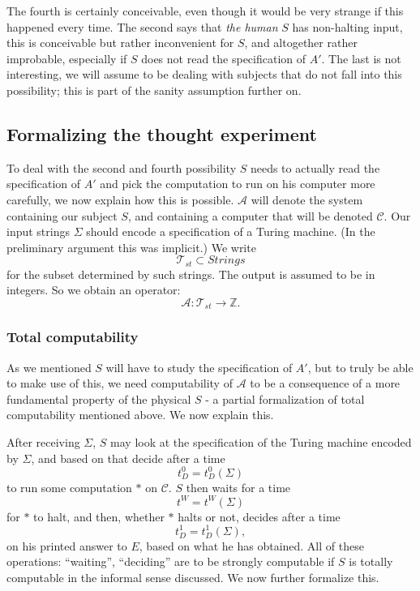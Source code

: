 \documentclass[9pt,twocolumn,twoside,lineno]{pnas-new}
\numberwithin{equation}{section}
\theoremstyle{definition}
\theoremstyle{remark}
\begin{document}
The fourth is certainly conceivable, even though it would be very strange if this happened every time. The second says that \emph{the human} $S$ has non-halting input, this is conceivable but rather inconvenient for $S$, and altogether rather improbable, especially if $S$ does not read the specification of $A'$.
The last is not interesting, we will assume to be dealing with subjects that do not fall into this possibility; this is part of the sanity assumption further on.
\subsection {Formalizing the thought experiment}
To deal with the second and fourth possibility $S$ needs to actually read the specification of $A'$ and pick the computation to run on his computer more carefully, we now explain how this is possible.
$\mathcal{A}$ will denote the system containing our subject $S$, and containing a computer that will be denoted $\mathcal{C}$.  Our input strings $\Sigma$ should encode a specification of a Turing machine. (In the preliminary argument this was implicit.) We write $$\mathcal{T} _{st} \subset Strings$$  for the subset determined by such strings.  The output is assumed to be in integers.
So we obtain an operator:
\begin{equation*}
\mathcal{A}: \mathcal{T} _{st}  \to \mathbb{Z}.
\end{equation*}
\subsubsection {Total computability} 
 As we mentioned $S$ will have to study the specification of $A' $, but to 
 truly be able to make use of this, we 
  need computability of $\mathcal{A}$ to be a consequence of a more fundamental property of the physical $S$ - a partial formalization of total computability mentioned above.  We now explain this. 


After receiving $\Sigma$, $S$ may look at the specification of the Turing machine encoded by $\Sigma$, and based on that decide after a time $$t _{D}   ^{0} = t _{D} ^{0} (\Sigma)    $$ to run some computation $*$
on $\mathcal{C}$. $S$ then waits for a time $$t ^{W} = t ^{W} (\Sigma)  $$ for $*$ to halt, and then, whether $*$ halts or not, decides after a time $$t  ^{1} _{D} = t _{D} ^{1} (\Sigma),   $$ on his printed answer to $E$, based on what he has obtained.
All of these operations: ``waiting'', ``deciding'' are to be strongly computable if $S$ is totally computable in the informal sense discussed. 
We now further formalize this.   
\end{document}
